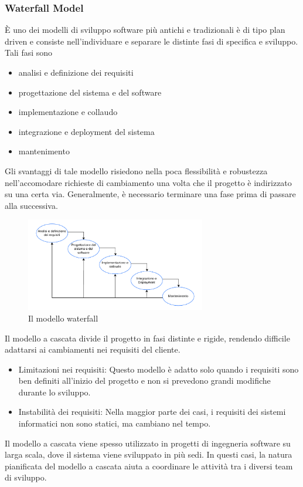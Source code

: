 \documentclass[10pt, letterpaper]{report}
\begin{document}
\subsubsection{Waterfall Model}
È uno dei modelli di sviluppo software più antichi e tradizionali è di tipo plan driven e consiste nell'individuare e separare le distinte fasi di  
specifica e sviluppo. Tali fasi sono\begin{itemize}
    \item analisi e definizione dei requisiti 
    \item progettazione del sistema e del software 
    \item implementazione e collaudo 
    \item integrazione e deployment del sistema 
    \item mantenimento
\end{itemize}
Gli svantaggi di tale modello risiedono nella poca flessibilità e robustezza nell'accomodare 
richieste di cambiamento una volta che il progetto è indirizzato su una certa via. 
Generalmente, è necessario terminare una fase prima di passare alla successiva.
\begin{figure}[h!]
    \centering 
    \includegraphics[width=0.7\textwidth ]{images/waterfallModel.pdf}
    \caption{Il modello waterfall}
\end{figure}
Il modello a cascata divide il progetto in fasi distinte e rigide, rendendo difficile adattarsi ai cambiamenti nei requisiti del cliente.\begin{itemize}
    \item Limitazioni nei requisiti: Questo modello è adatto solo quando i requisiti sono ben definiti all'inizio del progetto e non si prevedono grandi modifiche durante lo sviluppo.
    \item Instabilità dei requisiti: Nella maggior parte dei casi, i requisiti dei sistemi informatici non sono statici, ma cambiano nel tempo.
\end{itemize}
Il modello a cascata viene spesso utilizzato in progetti di ingegneria software su larga scala, dove il sistema viene sviluppato in più sedi.  In questi casi, la natura pianificata del modello a cascata aiuta a coordinare le attività tra i diversi team di sviluppo.
\end{document}
